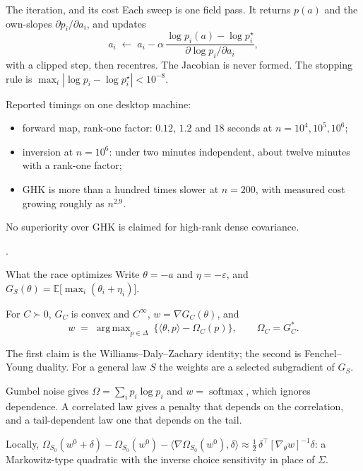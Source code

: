 \documentclass[aspectratio=169,11pt]{beamer}
\newcommand{\E}{\mathbb{E}}
\DeclareMathOperator*{\argmax}{arg\,max}
\newcommand{\src}[1]{\par\vfill{\scriptsize\color{gray}#1\par}}
\begin{document}
\begin{frame}{The iteration, and its cost}
Each sweep is one field pass. It returns $p(a)$ and the own-slopes
$\partial p_i/\partial a_i$, and updates
\[
  a_i \;\leftarrow\; a_i - \alpha\,
  \frac{\log p_i(a) - \log p^\star_i}{\partial \log p_i/\partial a_i},
\]
with a clipped step, then recentres. The Jacobian is never formed. The stopping
rule is $\max_i|\log p_i-\log p^\star_i|<10^{-8}$.

Reported timings on one desktop machine:

\begin{itemize}
\item forward map, rank-one factor: $0.12$, $1.2$ and $18$ seconds at
  $n=10^4,10^5,10^6$;
\item inversion at $n=10^6$: under two minutes independent, about twelve
  minutes with a rank-one factor;
\item GHK is more than a hundred times slower at $n=200$, with measured cost
  growing roughly as $n^{2.9}$.
\end{itemize}

No superiority over GHK is claimed for high-rank dense covariance.
\src{\cite{cotton2026inversion}.}
\end{frame}

\begin{frame}{What the race optimizes}
Write $\theta=-a$ and $\eta=-\varepsilon$, and
$G_S(\theta)=\E\big[\max_i(\theta_i+\eta_i)\big]$.

\begin{theorem}
For $C\succ0$, $G_C$ is convex and $C^\infty$, $w=\nabla G_C(\theta)$, and
\[
  w \;=\; \argmax_{p\in\Delta}\ \big\{\langle\theta,p\rangle-\Omega_C(p)\big\},
  \qquad \Omega_C = G_C^{*} .
\]
\end{theorem}

The first claim is the Williams--Daly--Zachary identity; the second is
Fenchel--Young duality. For a general law $S$ the weights are a selected
subgradient of $G_S$.

Gumbel noise gives $\Omega=\sum_i p_i\log p_i$ and $w=\operatorname{softmax}$,
which ignores dependence. A correlated law gives a penalty that depends on the
correlation, and a tail-dependent law one that depends on the tail.

Locally, $\Omega_{S_0}(w^0+\delta)-\Omega_{S_0}(w^0)-\langle\nabla\Omega_{S_0}(w^0),\delta\rangle
\approx \tfrac12\,\delta^\top[\nabla_\theta w]^{-1}\delta$: a Markowitz-type
quadratic with the inverse choice sensitivity in place of $\Sigma$.
\end{frame}
\end{document}
